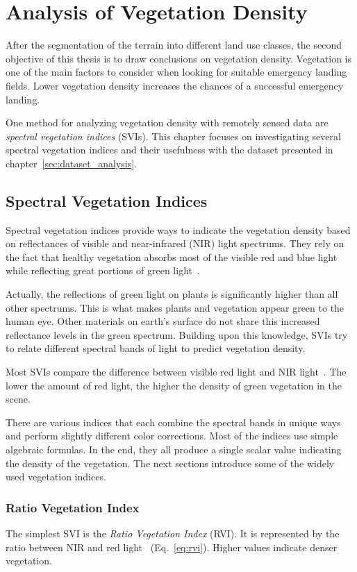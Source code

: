 \section{Analysis of Vegetation Density}
\label{sec:vegetation_analysis}
After the segmentation of the terrain into different land use classes, the second objective of this thesis is to draw conclusions on vegetation density. Vegetation is one of the main factors to consider when looking for suitable emergency landing fields. Lower vegetation density increases the chances of a successful emergency landing.

One method for analyzing vegetation density with remotely sensed data are \emph{spectral vegetation indices} (SVIs). This chapter focuses on investigating several spectral vegetation indices and their usefulness with the dataset presented in chapter~\ref{sec:dataset_analysis}.

\subsection{Spectral Vegetation Indices}
Spectral vegetation indices provide ways to indicate the vegetation density based on reflectances of visible and near-infrared (NIR) light spectrums. They rely on the fact that healthy vegetation absorbs most of the visible red and blue light while reflecting great portions of green light~\cite{glv03}.

Actually, the reflections of green light on plants is significantly higher than all other spectrums. This is what makes plants and vegetation appear green to the human eye. Other materials on earth's surface do not share this increased reflectance levels in the green spectrum. Building upon this knowledge, SVIs try to relate different spectral bands of light to predict vegetation density.

Most SVIs compare the difference between visible red light and NIR light~\cite{glv03}. The lower the amount of red light, the higher the density of green vegetation in the scene.

There are various indices that each combine the spectral bands in unique ways and perform slightly different color corrections. Most of the indices use simple algebraic formulas. In the end, they all produce a single scalar value indicating the density of the vegetation. The next sections introduce some of the widely used vegetation indices.

\subsubsection{Ratio Vegetation Index}
The simplest SVI is the \emph{Ratio Vegetation Index} (RVI). It is represented by the ratio between NIR and red light~\cite{glv03} (Eq.~\ref{eq:rvi}). Higher values indicate denser vegetation.


